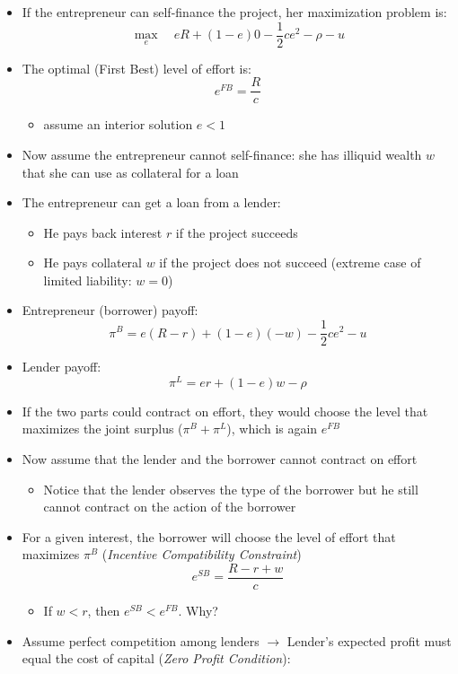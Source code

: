 \documentclass[a4paper]{article}
\begin{document}
\begin{itemize}
    \item If the entrepreneur can self-finance the project, her maximization problem is:
    \[\max_{e}\quad eR+(1-e)0-\frac{1}{2}ce^2-\rho-u \]
    \item The optimal (First Best) level of effort is:
    \[e^{FB}=\frac{R}{c} \]
    \begin{itemize}
        \item assume an interior solution $e<1$
    \end{itemize}
    \item Now assume the entrepreneur cannot self-finance: she has illiquid wealth $w$ that she can use as collateral for a loan
    \item The entrepreneur can get a loan from a lender:
    \begin{itemize}
        \item He pays back interest $r$ if the project  succeeds
        \item He pays collateral $w$ if the project does not succeed (extreme case of limited liability: $w=0$)
    \end{itemize}
    \item Entrepreneur (borrower) payoff:
    \[\pi^B=e(R-r)+(1-e)(-w)-\frac{1}{2}ce^2-u \]
    \item Lender payoff:
    \[\pi^L=er+(1-e)w-\rho \]
    \item If the two parts could contract on effort, they would choose the level that maximizes the joint surplus ($\pi^B+\pi^L$), which is again $e^{FB}$
    \item Now assume that the lender and the borrower cannot contract on effort
    \begin{itemize}
        \item Notice that the lender observes the type of the borrower but he still cannot contract on the action of the borrower
    \end{itemize}
    \item For a given interest, the borrower will choose the level of effort that maximizes $\pi^B$ (\textit{Incentive Compatibility Constraint})
    \[e^{SB}=\frac{R-r+w}{c} \]
    \begin{itemize}
        \item If $w<r$, then $e^{SB}<e^{FB}$. Why?
    \end{itemize}
    \item Assume perfect competition among lenders $\to$ Lender's expected profit must equal the cost of capital (\textit{Zero Profit Condition}):

\end{itemize}
\end{document}
